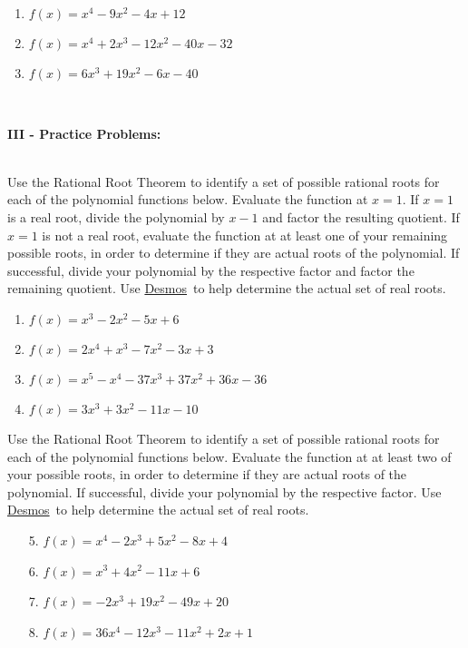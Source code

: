\documentclass[12pt]{article}
\theoremstyle{definition}
\newcommand{\Desmos}{\href{https://www.desmos.com/}{Desmos}}
\begin{document}
\begin{enumerate}
	\item $f(x) = x^{4} - 9x^{2} - 4x + 12$
	\item $f(x) = x^{4} + 2x^{3} - 12x^{2} - 40x - 32$
	\item $f(x) = 6x^3+19x^2-6x-40$
\end{enumerate}
\ \par
{\bf III - Practice Problems:}\\
\ \par
Use the Rational Root Theorem to identify a set of possible rational roots for each of the polynomial functions below.  Evaluate the function at $x=1$.  If $x=1$ is a real root, divide the polynomial by $x-1$ and factor the resulting quotient.  If $x=1$ is not a real root, evaluate the function at at least one of your remaining possible roots, in order to determine if they are actual roots of the polynomial.  If successful, divide your polynomial by the respective factor and factor the remaining quotient.  Use \Desmos \ to help determine the actual set of real roots.
\begin{enumerate}
	\item $f(x) = x^{3} - 2x^{2} - 5x + 6$
	\item $f(x) = 2x^4+x^3-7x^2-3x+3$
	\item $f(x) = x^5-x^4-37x^3+37x^2+36x-36$
	\item $f(x) = 3x^{3} + 3x^{2} - 11x - 10$
\end{enumerate}
Use the Rational Root Theorem to identify a set of possible rational roots for each of the polynomial functions below.  Evaluate the function at at least two of your possible roots, in order to determine if they are actual roots of the polynomial.  If successful, divide your polynomial by the respective factor.  Use \Desmos \ to help determine the actual set of real roots.
\begin{enumerate}
	\item[5.] $f(x) = x^{4} -2x^3+ 5x^{2} - 8x + 4$
	\item[6.] $f(x) = x^{3} + 4x^{2} - 11x + 6$
	\item[7.] $f(x) = -2x^{3} + 19x^{2} - 49x + 20$
	\item[8.] $f(x) = 36x^{4} - 12x^{3} - 11x^{2} + 2x + 1$
\end{enumerate}
\newpage
\ \newpage
\end{document}
